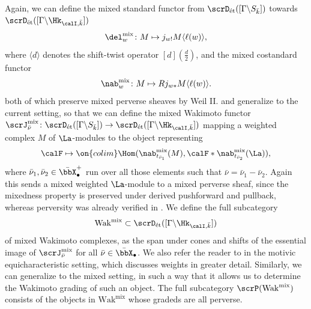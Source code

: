 \documentclass[10pt, reqno]{amsart}
\theoremstyle{plain}
\theoremstyle{definition}
\numberwithin{equation}{section}
\begin{document}
	Again, we can define the mixed standard functor from $\scrD_{\mathrm{\acute{e}t}}([\Gamma \backslash S_{\bar k}])$ towards $\scrD_{\mathrm{\acute{e}t}}([\Gamma \backslash\Hk_{\calI,\bar k}])$
	\begin{equation}
		\del_w^{\mathrm{mix}}\colon M \mapsto j_{w!}M\langle \ell(w)\rangle,
	\end{equation}
	where $\langle d \rangle$ denotes the shift-twist operator $[d](\frac{d}{2})$, and the mixed costandard functor
	\begin{equation}
		\nab_w^{\mathrm{mix}} \colon M \mapsto Rj_{w*}M\langle \ell(w)\rangle.
	\end{equation}
	both of which preserve mixed perverse sheaves by Weil II.  and  generalize to the current setting, so that we can define the mixed Wakimoto functor $\scrJ_{\bar \nu}^{\mathrm{mix}} \colon\scrD_{\mathrm{\acute{e}t}}([\Gamma \backslash S_{\bar k}]) \to \scrD_{\mathrm{\acute{e}t}}([\Gamma \backslash\Hk_{\calI,\bar k}]) $ mapping a weighted complex $M$ of $\La$-modules to the object representing
	\begin{equation}
		\calF \mapsto \on{colim}\Hom(\nab^{\mathrm{mix}}_{t_{\bar\nu_1}}(M),\calF \ast \nab^{\mathrm{mix}}_{t_{\bar\nu_2}}(\La)),
	\end{equation}
	where $\bar \nu_1, \bar \nu_2 \in \bar \bbX_\bullet^+$ run over all those elements such that $\bar \nu=\bar \nu_1-\bar \nu_2 $. Again this sends a mixed weighted $\La$-module to a mixed perverse sheaf, since the mixedness property is preserved under derived pushforward and pullback, whereas perversity was already verified in . We define the full subcategory \begin{equation}\mathrm{Wak}^\mathrm{mix}\subset \scrD_{\mathrm{\acute{e}t}}([\Gamma\backslash \Hk_{\calI,\bar k}])
	\end{equation} of mixed Wakimoto complexes, as the span under cones and shifts of the essential image of $\scrJ^{\mathrm{mix}}_{\bar \nu}$ for all $\bar \nu \in \bar \bbX_{\bullet}$. We also refer the reader to \cite[Definition 5.7]{CvdHS24} in the motivic equicharacteristic setting, which discusses weights in greater detail. Similarly, we can generalize  to the mixed setting, in such a way that it allows us to determine the Wakimoto grading of such an object. The full subcategory $\scrP(\mathrm{Wak}^{\mathrm{mix}})$ consists of the objects in $\mathrm{Wak}^\mathrm{mix}$ whose gradeds are all perverse.
	
\end{document}
